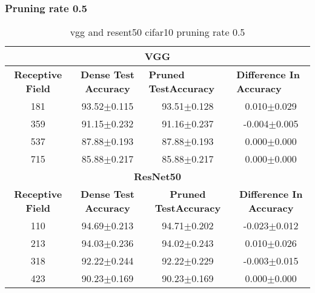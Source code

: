 \subsubsection*{Pruning rate 0.5}
\begin{table}[]
\begin{tabular}{@{}cccc@{}}
\toprule
\multicolumn{4}{c}{\textbf{VGG}}                                                                                                                                  \\ \midrule
\textbf{Receptive Field} & \textbf{Dense Test Accuracy} & \multicolumn{1}{l}{\textbf{Pruned  TestAccuracy}} & \multicolumn{1}{l}{\textbf{Difference In Accuracy}} \\ \midrule
181                      & 93.52$\pm$0.115              & 93.51$\pm$0.128                                   & 0.010$\pm$0.029                                     \\
359                      & 91.15$\pm$0.232              & 91.16$\pm$0.237                                   & -0.004$\pm$0.005                                    \\
537                      & 87.88$\pm$0.193              & 87.88$\pm$0.193                                   & 0.000$\pm$0.000                                     \\
715                      & 85.88$\pm$0.217              & 85.88$\pm$0.217                                   & 0.000$\pm$0.000                                     \\ \midrule
\multicolumn{4}{c}{\textbf{ResNet50}}                                                                                                                             \\ \midrule
\textbf{Receptive Field} & \textbf{Dense Test Accuracy} & \textbf{Pruned  TestAccuracy}                     & \textbf{Difference In Accuracy}                     \\
110                      & 94.69$\pm$0.213              & 94.71$\pm$0.202                                   & -0.023$\pm$0.012                                    \\
213                      & 94.03$\pm$0.236              & 94.02$\pm$0.243                                   & 0.010$\pm$0.026                                     \\
318                      & 92.22$\pm$0.244              & 92.22$\pm$0.229                                   & -0.003$\pm$0.015                                    \\
423                      & 90.23$\pm$0.169              & 90.23$\pm$0.169                                   & 0.000$\pm$0.000                                     \\ \bottomrule
\end{tabular}
\caption{vgg and resent50 cifar10 pruning rate 0.5}
\label{tab:cifar10 pruning rate05}
\end{table}

